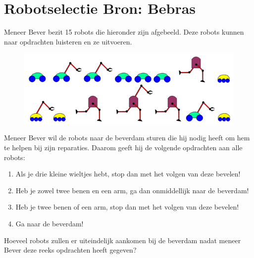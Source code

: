 \documentclass[12pt, a4paper]{article}
\begin{document}
	\begin{minipage}{\textwidth}
		\section{Robotselectie \hfill\small Bron: Bebras}
			
			Meneer Bever bezit 15 robots die hieronder zijn afgebeeld. Deze robots kunnen naar opdrachten luisteren en ze uitvoeren.
			
			\begin{figure}[H]
				\includegraphics[width=\linewidth]{image1}
			\end{figure}
			
			Meneer Bever wil de robots naar de beverdam sturen die hij nodig heeft om hem te helpen bij zijn reparaties. Daarom geeft hij de volgende opdrachten aan alle robots:
			
			\begin{enumerate}
				\item Als je drie kleine wieltjes hebt, stop dan met het volgen van deze bevelen!
				\item Heb je zowel twee benen en een arm, ga dan onmiddellijk naar de beverdam!
				\item Heb je twee benen of een arm, stop dan met het volgen van deze bevelen!
				\item Ga naar de beverdam!
			\end{enumerate}
			
			Hoeveel robots zullen er uiteindelijk aankomen bij de beverdam nadat meneer Bever deze reeks opdrachten heeft gegeven?
			


	\end{minipage} \\ \\ 
		
\end{document}
